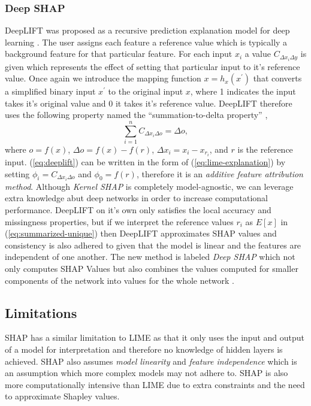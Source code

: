 \subsubsection{Deep SHAP}
DeepLIFT was proposed as a recursive prediction explanation model for deep learning \cite{DBLP:journals/corr/ShrikumarGSK16}\cite{DBLP:journals/corr/ShrikumarGK17}. The user assigns each feature a reference value which is typically a background feature for that particular feature. For each input $x_{i}$ a value $C_{\Delta{x_{i}}\Delta{y}}$ is given which represents the effect of setting that particular input to it's reference value. Once again we introduce the mapping function $x = h_{x}(x^{'})$ that converts a simplified binary input $x^{'}$ to the original input $x$, where 1 indicates the input takes it's original value and 0 it takes it's reference value.
DeepLIFT therefore uses the following property named the ``summation-to-delta property'' \cite{NIPS2017_7062},
\begin{equation}
    \sum\limits_{i=1}^{n}C_{\Delta{x_{i}}\Delta{o}} = \Delta{o},
    \label{eq:deeplift}
\end{equation}
    where $o = f(x)$, $\Delta{o} = f(x) - f(r)$, $\Delta{x_{i}} = x_{i} - x_{r_{i}}$, and $r$ is the reference input.
    (\ref{eq:deeplift}) can be written in the form of (\ref{eq:lime-explanation}) by setting $\phi_{i} = C_{\Delta{x_{i}}\Delta{o}}$ and $\phi_{0} = f(r)$, therefore it is an \emph{additive feature attribution method}.
Although \emph{Kernel SHAP} is completely model-agnostic, we can leverage extra knowledge abut deep networks in order to increase computational performance. DeepLIFT on it's own only satisfies the local accuracy and missingness properties, but if we interpret the reference values $r_{i}$ as $E[x]$ in  (\ref{eq:summarized-unique}) then DeepLIFT approximates SHAP values and consistency is also adhered to given that the model is linear and the features are independent of one another. The new method is labeled \emph{Deep SHAP} which not only computes SHAP Values but also combines the values computed for smaller components of the network into values for the whole network \cite{NIPS2017_7062}.


\subsection{Limitations}
SHAP has a similar limitation to LIME as that it only uses the input and output of a model for interpretation and therefore no knowledge of hidden layers is achieved. SHAP also assumes \emph{model linearity} and \emph{feature independence} which is an assumption which more complex models may not adhere to. SHAP is also more computationally intensive than LIME due to extra constraints and the need to approximate Shapley values.




